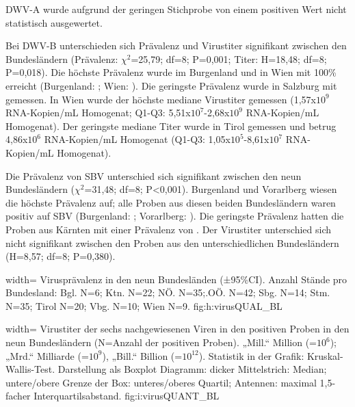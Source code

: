 DWV-A wurde aufgrund der geringen Stichprobe von einem positiven Wert nicht statistisch ausgewertet.

Bei DWV-B unterschieden sich Prävalenz und Virustiter signifikant zwischen den Bundesländern (Prävalenz: $\chi^2$=25,79; df=8; P=0,001; Titer: H=18,48; df=8; P=0,018). Die höchste Prävalenz wurde im Burgenland und in Wien mit 100\% erreicht (Burgenland: ; Wien: ). Die geringste Prävalenz wurde in Salzburg mit  gemessen. In Wien wurde der höchste mediane Virustiter gemessen (1,57x$10^9$ RNA-Kopien/\si{\milli\liter} Homogenat; Q1-Q3: 5,51x$10^7$-2,68x$10^9$ RNA-Kopien/\si{\milli\liter} Homogenat). Der geringste mediane Titer wurde in Tirol gemessen und betrug 4,86x$10^6$ RNA-Kopien/\si{\milli\liter} Homogenat (Q1-Q3: 1,05x$10^5$-8,61x$10^7$ RNA-Kopien/\si{\milli\liter} Homogenat).


Die Prävalenz von SBV unterschied sich signifikant zwischen den neun Bundesländern ($\chi^2$=31,48; df=8; P<0,001). Burgenland und Vorarlberg wiesen die höchste Prävalenz auf; alle Proben aus diesen beiden Bundesländern waren positiv auf SBV (Burgenland: ; Vorarlberg: ). Die geringste Prävalenz hatten die Proben aus Kärnten mit einer Prävalenz von . Der Virustiter unterschied sich nicht signifikant zwischen den Proben aus den unterschiedlichen Bundesländern (H=8,57; df=8; P=0,380).

  {width=\textwidth} %
  {Virusprävalenz in den neun Bundesländen (±95\%CI). Anzahl Stände pro Bundesland: Bgl. N=6; Ktn. N=22; NÖ. N=35;.OÖ. N=42; Sbg. N=14; Stm. N=35; Tirol N=20; Vbg. N=10; Wien N=9.} %
  {} %
  {fig:h:virusQUAL_BL} %
  
  
  {width=\textwidth} %
  {Virustiter der sechs nachgewiesenen Viren in den positiven Proben in den neun Bundesländern (N=Anzahl der positiven Proben). „Mill.“ Million (=$10^6$); „Mrd.“ Milliarde (=$10^9$), „Bill.“ Billion (=$10^{12}$). Statistik in der Grafik: Kruskal-Wallis-Test. Darstellung als Boxplot Diagramm: dicker Mittelstrich: Median; untere/obere Grenze der Box: unteres/oberes Quartil; Antennen: maximal 1,5-facher Interquartilsabstand.} %
  {} %
  {fig:i:virusQUANT_BL} %
  
